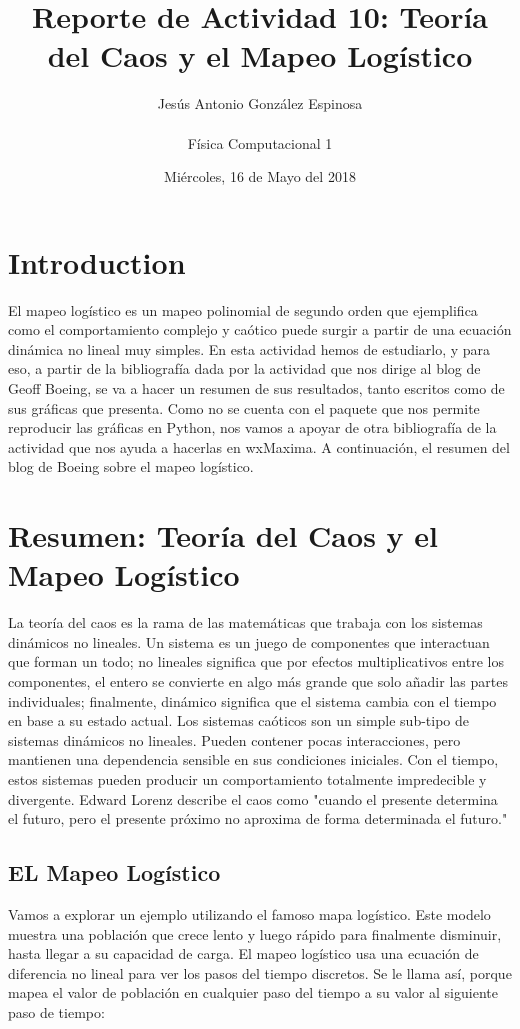 \documentclass[a4paper]{article}
\title{Reporte de Actividad 10: Teoría del Caos y el Mapeo Logístico}
\author{Jesús Antonio González Espinosa \\ \\ Física Computacional 1}
\date{Miércoles, 16 de Mayo del 2018}
\begin{document}
\maketitle

\section{Introduction}
El mapeo logístico es un mapeo polinomial de segundo orden que ejemplifica como el comportamiento complejo y caótico puede surgir a partir de una ecuación dinámica no lineal muy simples. En esta actividad hemos de estudiarlo, y para eso, a partir de la bibliografía dada por la actividad que nos dirige al blog de Geoff Boeing, se va a hacer un resumen de sus resultados, tanto escritos como de sus gráficas que presenta. Como no se cuenta con el paquete que nos permite reproducir las gráficas en Python, nos vamos a apoyar de otra bibliografía de la actividad que nos ayuda a hacerlas en wxMaxima. A continuación, el resumen del blog de Boeing sobre el mapeo logístico.

\section{Resumen: Teoría del Caos y el Mapeo Logístico}
La teoría del caos es la rama de las matemáticas que trabaja con los sistemas dinámicos no lineales. Un sistema es un juego de componentes que interactuan que forman un todo; no lineales significa que por efectos multiplicativos entre los componentes, el entero se convierte en algo más grande que solo añadir las partes individuales; finalmente, dinámico significa que el sistema cambia con el tiempo en base a su estado actual. Los sistemas caóticos son un simple sub-tipo de sistemas dinámicos no lineales. Pueden contener pocas interacciones, pero mantienen una dependencia sensible en sus condiciones iniciales. Con el tiempo, estos sistemas pueden producir un comportamiento totalmente impredecible y divergente. Edward Lorenz describe el caos como "cuando el presente determina el futuro, pero el presente próximo no aproxima de forma determinada el futuro."

\subsection{EL Mapeo Logístico}
Vamos a explorar un ejemplo utilizando el famoso mapa logístico. Este modelo muestra una población que crece lento y luego rápido para finalmente disminuir, hasta llegar a su capacidad de carga. El mapeo logístico usa una ecuación de diferencia no lineal para ver los pasos del tiempo discretos. Se le llama así, porque mapea el valor de población en cualquier paso del tiempo a su valor al siguiente paso de tiempo:
\end{document}
